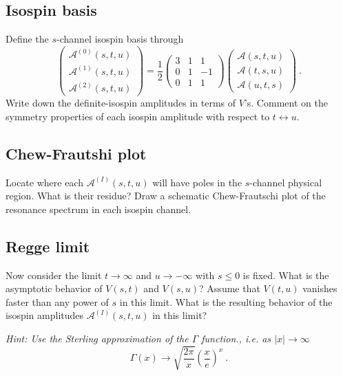 \subsection{Isospin basis} 
Define the $s$-channel isospin basis through
    \begin{equation}
        \begin{pmatrix}
            \mathcal{A}^{(0)}(s,t,u) \\
            \mathcal{A}^{(1)}(s,t,u) \\
            \mathcal{A}^{(2)}(s,t,u)             
        \end{pmatrix}
        = 
        \frac{1}{2}\begin{pmatrix}
            3 & 1 & 1 \\
            0 & 1 & -1 \\
            0 & 1 & 1 
        \end{pmatrix}
        \begin{pmatrix}
            \mathcal{A}(s,t,u) \\
            \mathcal{A}(t,s,u) \\
            \mathcal{A}(u,t,s)              
        \end{pmatrix}
        ~.
    \end{equation}
Write down the definite-isospin amplitudes in terms of $V$'s. Comment on the symmetry properties of each isospin amplitude with respect to $t \leftrightarrow u$. 

\subsection{Chew-Frautshi plot}
Locate where each $\mathcal{A}^{(I)}(s,t,u)$ will have poles in the $s$-channel physical region. What is their residue? Draw a schematic Chew-Frautschi plot of the resonance spectrum in each isospin channel.

\subsection{Regge limit}
Now consider the limit $t \to \infty$ and $u \to - \infty$ with $s \leq 0$ is fixed. What is the asymptotic behavior of $V(s,t)$ and $V(s,u)$? Assume that $V(t,u)$ vanishes faster than any power of $s$ in this limit. What is the resulting behavior of the isospin amplitudes $\mathcal{A}^{(I)}(s,t,u)$ in this limit?

\noindent \textit{ Hint: Use the Sterling approximation of the $\Gamma$ function., i.e. as $|x|\to \infty$
    \begin{equation}
        \Gamma(x) \to \sqrt{\frac{2\pi}{x}} \left( \frac{x}{e} \right)^x ~.
    \end{equation}
}

